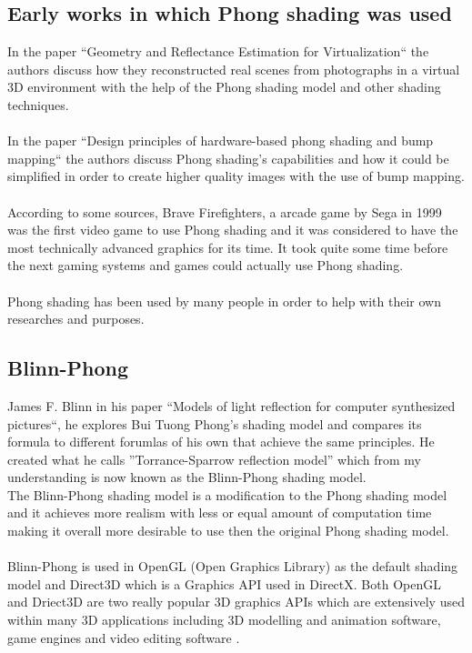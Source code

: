 \documentclass{scrartcl}
\begin{document}
\subsection{Early works in which Phong shading was used}
In the paper ``Geometry and Reflectance Estimation for Virtualization`` the authors discuss how they reconstructed real scenes from photographs in a virtual 3D environment with the help of the Phong shading model and other shading techniques.\cite{three}
\\~\\
In the paper ``Design principles of hardware-based phong shading and bump mapping`` the authors discuss Phong shading's capabilities and how it could be simplified in order to create higher quality images with the use of bump mapping.\cite{four}
\\~\\
According to some sources, Brave Firefighters, a arcade game by Sega in 1999 was the first video game to use Phong shading and it was considered to have the most technically advanced graphics for its time. It took quite some time before the next gaming systems and games could actually use Phong shading.\cite{five}\cite{eight}
\\~\\
Phong shading has been used by many people in order to help with their own researches and purposes.

\subsection{Blinn-Phong}
James F. Blinn in his paper ``Models of light reflection for computer synthesized pictures``, he explores Bui Tuong Phong's shading model and compares its formula to different forumlas of his own that achieve the same principles. He created what he calls ''Torrance-Sparrow reflection model'' which from my understanding is now known as the Blinn-Phong shading model.\\
The Blinn-Phong shading model is a modification to the Phong shading model and it achieves more realism with less or equal amount of computation time making it overall more desirable to use then the original Phong shading model.\cite{two}
\\~\\
Blinn-Phong is used in OpenGL (Open Graphics Library) as the default shading model and Direct3D which is a Graphics API used in DirectX. Both OpenGL and Driect3D are two really popular 3D graphics APIs which are extensively used within many 3D applications including 3D modelling and animation software, game engines and video editing software .
\end{document}
